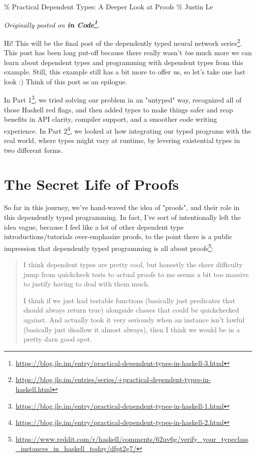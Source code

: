 \documentclass[]{article}
\renewcommand{\href}[2]{#2\footnote{\url{#1}}}
\begin{document}
\% Practical Dependent Types: A Deeper Look at Proofs \% Justin Le

\emph{Originally posted on
\textbf{\href{https://blog.jle.im/entry/practical-dependent-types-in-haskell-3.html}{in
Code}}.}

Hi! This will be the final post of the
\href{https://blog.jle.im/entries/series/+practical-dependent-types-in-haskell.html}{dependently
typed neural network series}. This post has been long put-off because there
really wasn't \emph{too} much more we can learn about dependent types and
programming with dependent types from this example. Still, this example still
has a bit more to offer us, so let's take one last look :) Think of this post as
an epilogue.

In
\href{https://blog.jle.im/entry/practical-dependent-types-in-haskell-1.html}{Part
1}, we tried solving our problem in an "untyped" way, recognized all of those
Haskell red flags, and then added types to make things safer and reap benefits
in API clarity, compiler support, and a smoother code writing experience. In
\href{https://blog.jle.im/entry/practical-dependent-types-in-haskell-2.html}{Part
2}, we looked at how integrating our typed programs with the real world, where
types might vary at runtime, by levering existential types in two different
forms.

\section{The Secret Life of Proofs}

So far in this journey, we've hand-waved the idea of "proofs", and their role in
this dependently typed programming. In fact, I've sort of intentionally left the
idea vague, because I feel like a lot of other dependent type
introductions/tutorials over-emphasize proofs, to the point there is a public
impression that
\href{https://www.reddit.com/r/haskell/comments/62uv6g/verify_your_typeclass_instances_in_haskell_today/dfpt2g7/}{dependently
typed programming is all about proofs}:

\begin{quote}
I think dependent types are pretty cool, but honestly the sheer difficulty jump
from quickcheck tests to actual proofs to me seems a bit too massive to justify
having to deal with them much.

I think if we just had testable functions (basically just predicates that should
always return true) alongside classes that could be quickchecked against. And
actually took it very seriously when an instance isn't lawful (basically just
disallow it almost always), then I think we would be in a pretty darn good spot.
\end{quote}
\end{document}
